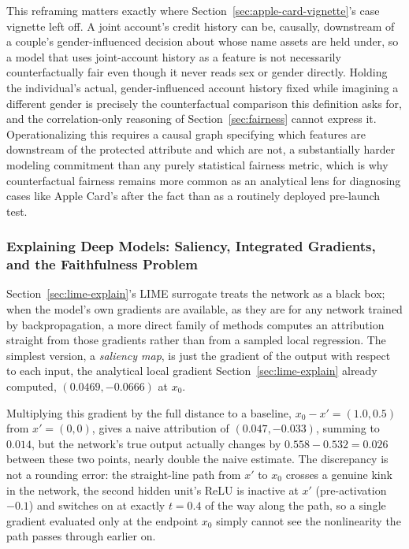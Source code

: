 \documentclass[../ai_in_finance]{subfiles}
\begin{document}
This reframing matters exactly where Section~\ref{sec:apple-card-vignette}'s case vignette left off. A joint account's credit history can be, causally, downstream of a couple's gender-influenced decision about whose name assets are held under, so a model that uses joint-account history as a feature is not necessarily counterfactually fair even though it never reads sex or gender directly. Holding the individual's actual, gender-influenced account history fixed while imagining a different gender is precisely the counterfactual comparison this definition asks for, and the correlation-only reasoning of Section~\ref{sec:fairness} cannot express it. Operationalizing this requires a causal graph specifying which features are downstream of the protected attribute and which are not, a substantially harder modeling commitment than any purely statistical fairness metric, which is why counterfactual fairness remains more common as an analytical lens for diagnosing cases like Apple Card's after the fact than as a routinely deployed pre-launch test.

\subsubsection*{Explaining Deep Models: Saliency, Integrated Gradients, and the Faithfulness Problem}

Section~\ref{sec:lime-explain}'s LIME surrogate treats the network as a black box; when the model's own gradients are available, as they are for any network trained by
 backpropagation, a more direct family of methods computes an attribution straight from those gradients rather than from a sampled local
 regression. The simplest version, a \emph{saliency map}, is just the gradient of the output with respect to each input, the
 analytical local gradient Section~\ref{sec:lime-explain} already computed, $(0.0469, -0.0666)$ at $x_0$.

Multiplying this gradient by
 the full distance to a baseline, $x_0 - x' = (1.0, 0.5)$ from $x' = (0,0)$, gives a naive attribution of $(0.047, -0.033)$,
 summing to $0.014$, but the network's true output actually changes by $0.558 - 0.532 = 0.026$ between these two points, nearly double the naive estimate. The discrepancy is not a rounding error: the straight-line path from $x'$ to $x_0$ crosses a genuine kink in the network, the second hidden unit's ReLU is inactive at $x'$ (pre-activation $-0.1$) and switches on at exactly $t = 0.4$ of the way along the path, so a single gradient evaluated only at the endpoint $x_0$ simply cannot see the nonlinearity the path passes through earlier on.
\end{document}
